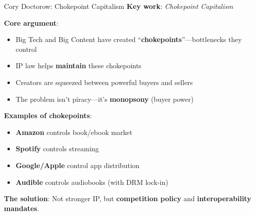 \documentclass[aspectratio=169]{beamer}
\begin{document}
\begin{frame}{Cory Doctorow: Chokepoint Capitalism}
\textbf{Key work}: \textit{Chokepoint Capitalism} \parencite{doctorow_chokepoint}

\vspace{0.2cm}
\textbf{Core argument}:
\begin{itemize}
    \item Big Tech and Big Content have created ``\textbf{chokepoints}''---bottlenecks they control
    \item IP law helps \textbf{maintain} these chokepoints
    \item Creators are squeezed between powerful buyers and sellers
    \item The problem isn't piracy---it's \textbf{monopsony} (buyer power)
\end{itemize}

\vspace{0.3cm}
\textbf{Examples of chokepoints}:
\begin{itemize}
    \item \textbf{Amazon} controls book/ebook market
    \item \textbf{Spotify} controls streaming
    \item \textbf{Google/Apple} control app distribution
    \item \textbf{Audible} controls audiobooks (with DRM lock-in)
\end{itemize}

\vspace{0.2cm}
\textbf{The solution}: Not stronger IP, but \textbf{competition policy} and \textbf{interoperability mandates}.
\end{frame}
\end{document}
